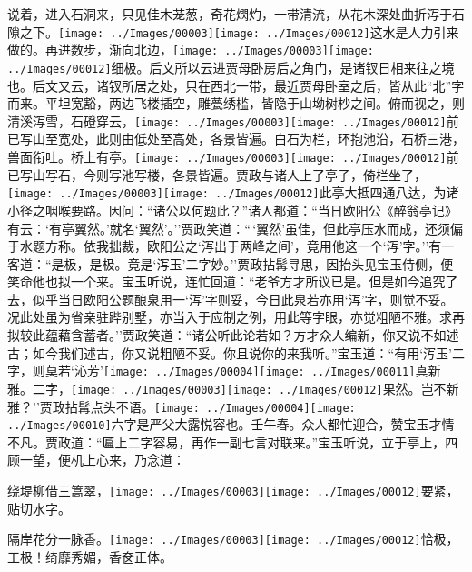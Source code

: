 说着，进入石洞来，只见佳木茏葱，奇花熌灼，一带清流，从花木深处曲折泻于石隙之下。{\texttt{[image: ../Images/00003]}\texttt{[image: ../Images/00012]}\footnotesize \kaishu 这水是人力引来做的。}再进数步，渐向北边，{\texttt{[image: ../Images/00003]}\texttt{[image: ../Images/00012]}\footnotesize \kaishu 细极。后文所以云进贾母卧房后之角门，是诸钗日相来往之境也。后文又云，诸钗所居之处，只在西北一带，最近贾母卧室之后，皆从此``北''字而来。}平坦宽豁，两边飞楼插空，雕甍绣槛，皆隐于山坳树杪之间。俯而视之，则清溪泻雪，石磴穿云，{\texttt{[image: ../Images/00003]}\texttt{[image: ../Images/00012]}\footnotesize \kaishu 前已写山至宽处，此则由低处至高处，各景皆遍。}白石为栏，环抱池沿，石桥三港，兽面衔吐。桥上有亭。{\texttt{[image: ../Images/00003]}\texttt{[image: ../Images/00012]}\footnotesize \kaishu 前已写山写石，今则写池写楼，各景皆遍。}贾政与诸人上了亭子，倚栏坐了，{\texttt{[image: ../Images/00003]}\texttt{[image: ../Images/00012]}\footnotesize \kaishu 此亭大抵四通八达，为诸小径之咽喉要路。}因问：``诸公以何题此？''诸人都道：``当日欧阳公《醉翁亭记》有云：`有亭翼然。'就名`翼然'。''贾政笑道：``\,`翼然'虽佳，但此亭压水而成，还须偏于水题方称。依我拙裁，欧阳公之`泻出于两峰之间'，竟用他这一个`泻'字。''有一客道：``是极，是极。竟是`泻玉'二字妙。''贾政拈髯寻思，因抬头见宝玉侍侧，便笑命他也拟一个来。宝玉听说，连忙回道：``老爷方才所议已是。但是如今追究了去，似乎当日欧阳公题酿泉用一`泻'字则妥，今日此泉若亦用`泻'字，则觉不妥。况此处虽为省亲驻跸别墅，亦当入于应制之例，用此等字眼，亦觉粗陋不雅。求再拟较此蕴藉含蓄者。''贾政笑道：``诸公听此论若如？方才众人编新，你又说不如述古；如今我们述古，你又说粗陋不妥。你且说你的来我听。''宝玉道：``有用`泻玉'二字，则莫若`沁芳'{\texttt{[image: ../Images/00004]}\texttt{[image: ../Images/00011]}\footnotesize \kaishu 真新雅。}二字，{\texttt{[image: ../Images/00003]}\texttt{[image: ../Images/00012]}\footnotesize \kaishu 果然。}岂不新雅？''贾政拈髯点头不语。{\texttt{[image: ../Images/00004]}\texttt{[image: ../Images/00010]}\footnotesize \kaishu 六字是严父大露悦容也。壬午春。}众人都忙迎合，赞宝玉才情不凡。贾政道：``匾上二字容易，再作一副七言对联来。''宝玉听说，立于亭上，四顾一望，便机上心来，乃念道：

绕堤柳借三篙翠，{\texttt{[image: ../Images/00003]}\texttt{[image: ../Images/00012]}\footnotesize \kaishu 要紧，贴切水字。}

隔岸花分一脉香。{\texttt{[image: ../Images/00003]}\texttt{[image: ../Images/00012]}\footnotesize \kaishu 恰极，工极！绮靡秀媚，香奁正体。}

